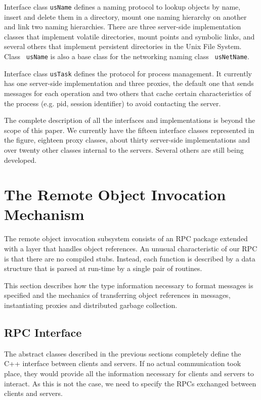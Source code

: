 Interface class {\tt usName} defines a naming protocol to lookup
objects by name, insert and delete them in a directory, mount
one naming hierarchy on another and link two naming hierarchies. There
are three server-side implementation classes that implement volatile
directories, mount points and symbolic links, and several others that
implement persistent directories in the Unix File System. Class {\tt
usName} is also a base class for the networking naming class {\tt
usNetName}.

Interface class {\tt usTask} defines the protocol for process
management. It currently has one server-side implementation and three
proxies, the default one that sends messages for each operation and
two others that cache certain characteristics of the process (e.g.
pid, session identifier) to avoid contacting the server.

The complete description of all the interfaces and implementations is
beyond the scope of this paper. We currently have the fifteen
interface classes represented in the figure, eighteen proxy classes,
about thirty server-side implementations and over twenty other classes
internal to the servers. Several others are still being developed.

\section{The Remote Object Invocation Mechanism}

The remote object invocation subsystem consists of an RPC package
extended with a layer that handles object references. An unusual
characteristic of our RPC is that there are no compiled stubs.
Instead, each function is described by a data structure that is parsed
at run-time by a single pair of routines.

This section describes how the type information necessary to format
messages is specified and the mechanics of transferring object references
in messages, instantiating proxies and distributed garbage
collection.

\subsection{RPC Interface}

The abstract classes described in the previous sections completely
define the C++ interface between clients and servers. If no
actual communication took place, they would provide all the
information necessary 
for clients and servers to interact. As this is not the case, we need
to specify the RPCs exchanged between clients and servers.

